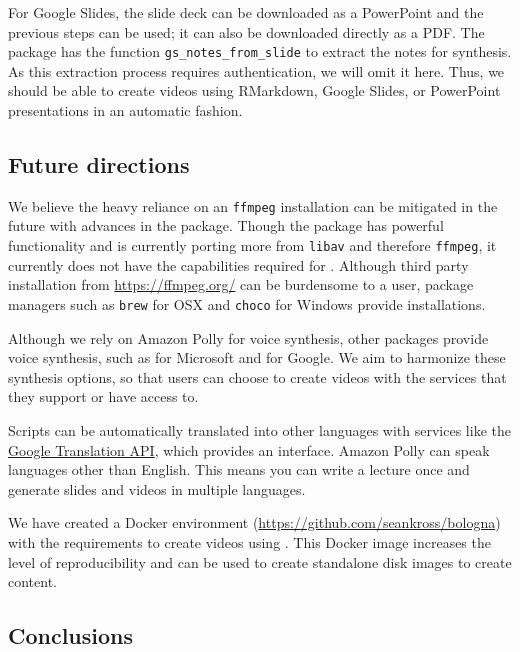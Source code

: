 For Google Slides, the slide deck can be downloaded as a PowerPoint and
the previous steps can be used; it can also be downloaded directly as a
PDF. The  package has the function
\texttt{gs\_notes\_from\_slide} to extract the notes for synthesis. As
this extraction process requires authentication, we will omit it here.
Thus, we should be able to create videos using RMarkdown, Google Slides,
or PowerPoint presentations in an automatic fashion.

\hypertarget{future-directions}{%
\subsection{Future directions}\label{future-directions}}

We believe the heavy reliance on an \texttt{ffmpeg} installation can be
mitigated in the future with advances in the  package. Though
the  package has powerful functionality and is currently porting
more from \texttt{libav} and therefore \texttt{ffmpeg}, it currently
does not have the capabilities required for . Although third
party installation from \url{https://ffmpeg.org/} can be burdensome to a
user, package managers such as \texttt{brew} for OSX and \texttt{choco}
for Windows provide installations.

Although we rely on Amazon Polly for voice synthesis, other packages
provide voice synthesis, such as  for Microsoft and
 for Google. We aim to harmonize these
synthesis options, so that users can choose to create videos with the
services that they support or have access to.

Scripts can be automatically translated into other languages with
services like the \href{https://cloud.google.com/translate/docs/}{Google
Translation API}, which  provides an interface.
Amazon Polly can speak languages other than English. This means you can
write a lecture once and generate slides and videos in multiple
languages.

We have created a Docker environment
(\url{https://github.com/seankross/bologna}) with the requirements to
create videos using . This Docker image increases the level of
reproducibility and can be used to create standalone disk images to
create content.

\hypertarget{conclusions}{%
\subsection{Conclusions}\label{conclusions}}

